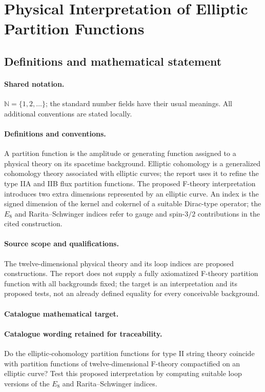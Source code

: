 \documentclass[11pt]{article}
\begin{document}
\section{Physical Interpretation of Elliptic Partition Functions}\label{statement}

\subsection{Definitions and mathematical statement}

\paragraph{Shared notation.}$\mathbb N=\{1,2,\ldots\}$; the standard number fields have their usual meanings. All additional conventions are stated locally.


\paragraph{Definitions and conventions.} A partition function is the amplitude or generating function assigned to a physical theory on its spacetime background. Elliptic cohomology is a generalized cohomology theory associated with elliptic curves; the report uses it to refine the type IIA and IIB flux partition functions. The proposed F-theory interpretation introduces two extra dimensions represented by an elliptic curve. An index is the signed dimension of the kernel and cokernel of a suitable Dirac-type operator; the $E_8$ and Rarita--Schwinger indices refer to gauge and spin-$3/2$ contributions in the cited construction.

\paragraph{Source scope and qualifications.} The twelve-dimensional physical theory and its loop indices are proposed constructions. The report does not supply a fully axiomatized F-theory partition function with all backgrounds fixed; the target is an interpretation and its proposed tests, not an already defined equality for every conceivable background.

\paragraph{Catalogue mathematical target.}
\paragraph{Catalogue wording retained for traceability.}
Do the elliptic-cohomology partition functions for type II string theory coincide with partition functions of twelve-dimensional F-theory compactified on an elliptic curve? Test this proposed interpretation by computing suitable loop versions of the $E_8$ and Rarita–Schwinger indices.
\end{document}

